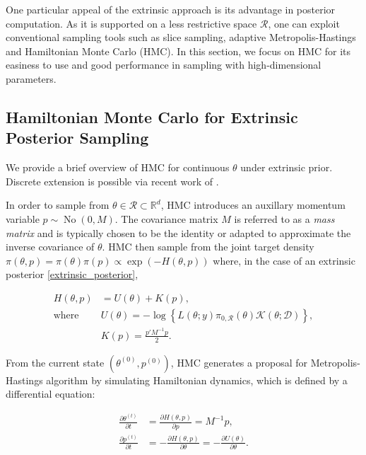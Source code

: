 \documentclass[10pt]{article}
\newcommand{\mc}[1]{\mathcal{#1}}
\DeclareMathOperator{\No}{No}
\DeclareMathOperator{\1}{\mathbbm{1}}
\newcommand{\mass}{M} %
\begin{document}
One particular appeal of the extrinsic approach is its advantage in posterior computation. As it is supported on a less restrictive space $\mc R$, one can exploit conventional sampling tools such as slice sampling, adaptive Metropolis-Hastings and Hamiltonian Monte Carlo (HMC). In this section, we focus on HMC for its easiness to use and good performance in sampling with high-dimensional parameters.

\subsection{Hamiltonian Monte Carlo for Extrinsic Posterior Sampling}

We provide a brief overview of HMC for continuous $\theta$ under extrinsic prior. Discrete extension is possible via recent work of \cite{nishimura2017discontinuous}.

In order to sample from $\theta\in\mc R \subset \mathbb R^d$, HMC introduces an auxillary momentum variable $p \sim \No(0, \mass)$. The covariance matrix $\mass$ is referred to as a \textit{mass matrix} and is typically chosen to be the identity or adapted to approximate the inverse covariance of $\theta$. HMC then sample from the joint target density $\pi(\theta, p) = \pi(\theta) \pi(p) \propto \exp (- H(\theta, p))$ where, in the case of an extrinsic posterior \eqref{extrinsic_posterior}, 


\begin{equation}
\begin{aligned}
H(\theta, p)& = U(\theta)+K(p),\\
\text{where } & U(\theta) = -\log\left\{ L(\theta;y)\pi_{0,\mc R}(\theta) \mc{K}(\theta;\mc D) \right\},\\
& K(p) = \frac{p'\mass^{-1} p}{2}.
\end{aligned}
\end{equation}

From the current state $(\theta^{(0)},p^{(0)})$, HMC generates a proposal for Metropolis-Hastings algorithm by simulating Hamiltonian dynamics, which is defined by a differential equation:

\begin{equation}
\begin{aligned}
\label{hamiltonian}
\frac{\partial \theta ^{(t)}}{\partial t} & =\frac{\partial H(\theta, p)}{\partial p} = \mass^{-1}p,\\
\frac{\partial p^{(t)}}{\partial t}& =-\frac{\partial H(\theta, p)}{\partial \theta} = -\frac{\partial U(\theta)}{\partial \theta}.
\end{aligned}
\end{equation}
\end{document}
